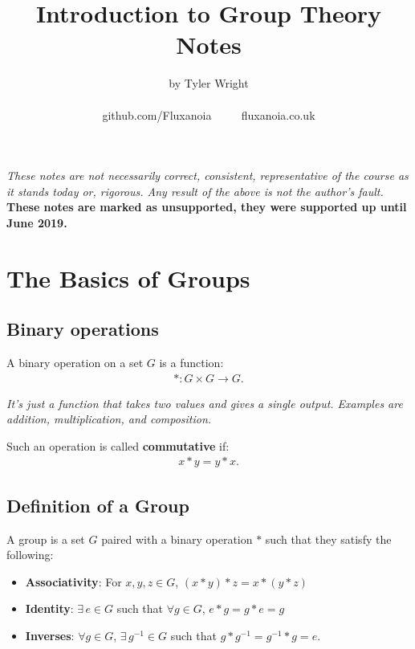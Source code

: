 \documentclass[a4paper, 12pt, twoside]{article}
\begin{document}
\title{Introduction to Group Theory Notes}
\date{}
\author{by Tyler Wright \\
  \\
  github.com/Fluxanoia $\qquad$ fluxanoia.co.uk
}
\maketitle

\vfill

\textit{These notes are not necessarily correct,
consistent, representative of the course as it stands today or, 
rigorous. Any result of the above is not the author's fault.}
\\[\baselineskip]
\textbf{These notes are marked as unsupported, they were supported
up until June 2019.}

\newpage

\section{The Basics of Groups}

\subsection{Binary operations}

A binary operation on a set $G$ is a function:
\begin{align*}
      * : G \times G \to G.
\end{align*}

\textit{It's just a function that takes two values and gives a single
      output. Examples are addition, multiplication, and composition.}

\vspace{\baselineskip}

Such an operation is called \textbf{commutative} if:
\begin{align*}
      x * y = y * x. \tag{$\forall x, y \in G$}
\end{align*}

\subsection{Definition of a Group}

A group is a set $G$ paired with a binary operation $*$ such that they satisfy
the following:

\begin{itemize}
      \item \textbf{Associativity}: For $x, y, z \in G$,
            $(x * y) * z = x * (y * z)$
      \item \textbf{Identity}: $\exists \, e \in G$ such that
            $\forall g \in G$, $e * g = g * e = g$
      \item \textbf{Inverses}: $\forall g \in G$, $\exists \, g^{-1} \in G$
            such that $g * g^{-1} = g^{-1} * g = e$.
\end{itemize}
\end{document}
